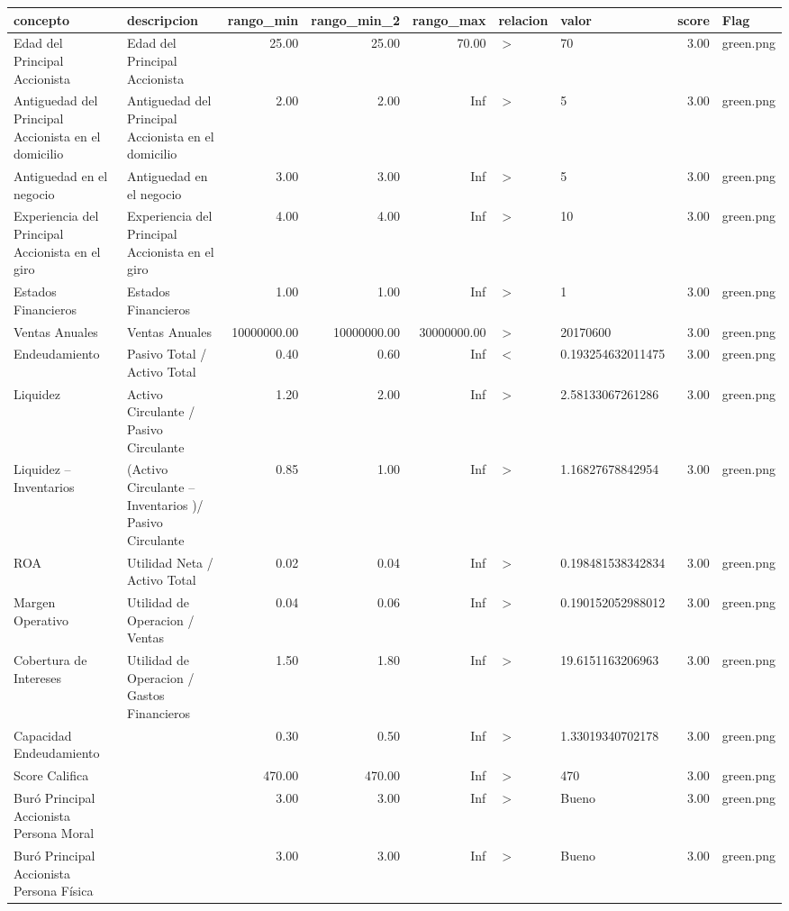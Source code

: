 \begin{tabular}{llrrrllrl}
  \hline
concepto & descripcion & rango\_min & rango\_min\_2 & rango\_max & relacion & valor & score & Flag \\ 
  \hline
Edad del Principal Accionista & Edad del Principal Accionista & 25.00 & 25.00 & 70.00 & $>$ & 70 & 3.00 & green.png \\ 
  Antiguedad del Principal Accionista en el domicilio & Antiguedad del Principal Accionista en el domicilio & 2.00 & 2.00 & Inf & $>$ & 5 & 3.00 & green.png \\ 
  Antiguedad en el negocio & Antiguedad en el negocio & 3.00 & 3.00 & Inf & $>$ & 5 & 3.00 & green.png \\ 
  Experiencia del Principal Accionista en el giro & Experiencia del Principal Accionista en el giro & 4.00 & 4.00 & Inf & $>$ & 10 & 3.00 & green.png \\ 
  Estados Financieros & Estados Financieros & 1.00 & 1.00 & Inf & $>$ & 1 & 3.00 & green.png \\ 
  Ventas Anuales & Ventas Anuales & 10000000.00 & 10000000.00 & 30000000.00 & $>$ & 20170600 & 3.00 & green.png \\ 
  Endeudamiento & Pasivo Total / Activo Total & 0.40 & 0.60 & Inf & $<$ & 0.193254632011475 & 3.00 & green.png \\ 
  Liquidez & Activo Circulante / Pasivo Circulante & 1.20 & 2.00 & Inf & $>$ & 2.58133067261286 & 3.00 & green.png \\ 
  Liquidez – Inventarios & (Activo Circulante – Inventarios )/ Pasivo Circulante & 0.85 & 1.00 & Inf & $>$ & 1.16827678842954 & 3.00 & green.png \\ 
  ROA & Utilidad Neta / Activo Total & 0.02 & 0.04 & Inf & $>$ & 0.198481538342834 & 3.00 & green.png \\ 
  Margen Operativo & Utilidad de Operacion / Ventas & 0.04 & 0.06 & Inf & $>$ & 0.190152052988012 & 3.00 & green.png \\ 
  Cobertura de Intereses & Utilidad de Operacion / Gastos Financieros & 1.50 & 1.80 & Inf & $>$ & 19.6151163206963 & 3.00 & green.png \\ 
  Capacidad Endeudamiento &  & 0.30 & 0.50 & Inf & $>$ & 1.33019340702178 & 3.00 & green.png \\ 
  Score Califica &  & 470.00 & 470.00 & Inf & $>$ & 470 & 3.00 & green.png \\ 
  Buró Principal Accionista Persona Moral &  & 3.00 & 3.00 & Inf & $>$ & Bueno & 3.00 & green.png \\ 
  Buró Principal Accionista Persona Física &  & 3.00 & 3.00 & Inf & $>$ & Bueno & 3.00 & green.png \\ 
   \hline
\end{tabular}
